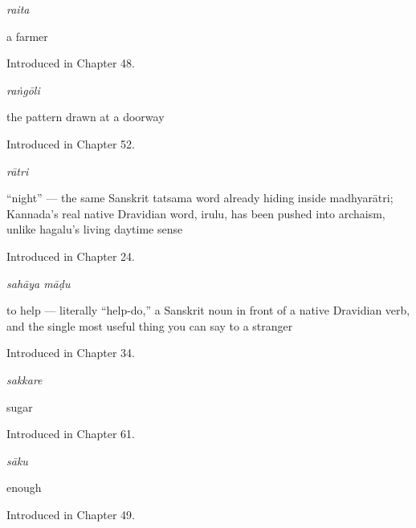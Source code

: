 \noindent\begin{minipage}[t]{\linewidth}
\raggedright
\textbf{}\enspace\emph{raita}\par
\small a farmer\par
\footnotesize Introduced in Chapter 48.
\end{minipage}\par\medskip

\noindent\begin{minipage}[t]{\linewidth}
\raggedright
\textbf{}\enspace\emph{raṅgōli}\par
\small the pattern drawn at a doorway\par
\footnotesize Introduced in Chapter 52.
\end{minipage}\par\medskip

\noindent\begin{minipage}[t]{\linewidth}
\raggedright
\textbf{}\enspace\emph{rātri}\par
\small \textquotedblleft{}night\textquotedblright{} — the same Sanskrit tatsama word already hiding inside madhyarātri; Kannada's real native Dravidian word, irulu, has been pushed into archaism, unlike hagalu's living daytime sense\par
\footnotesize Introduced in Chapter 24.
\end{minipage}\par\medskip

\noindent\begin{minipage}[t]{\linewidth}
\raggedright
\textbf{ }\enspace\emph{sahāya māḍu}\par
\small to help — literally \textquotedblleft{}help-do,\textquotedblright{} a Sanskrit noun in front of a native Dravidian verb, and the single most useful thing you can say to a stranger\par
\footnotesize Introduced in Chapter 34.
\end{minipage}\par\medskip

\noindent\begin{minipage}[t]{\linewidth}
\raggedright
\textbf{}\enspace\emph{sakkare}\par
\small sugar\par
\footnotesize Introduced in Chapter 61.
\end{minipage}\par\medskip

\noindent\begin{minipage}[t]{\linewidth}
\raggedright
\textbf{}\enspace\emph{sāku}\par
\small enough\par
\footnotesize Introduced in Chapter 49.
\end{minipage}\par\medskip

